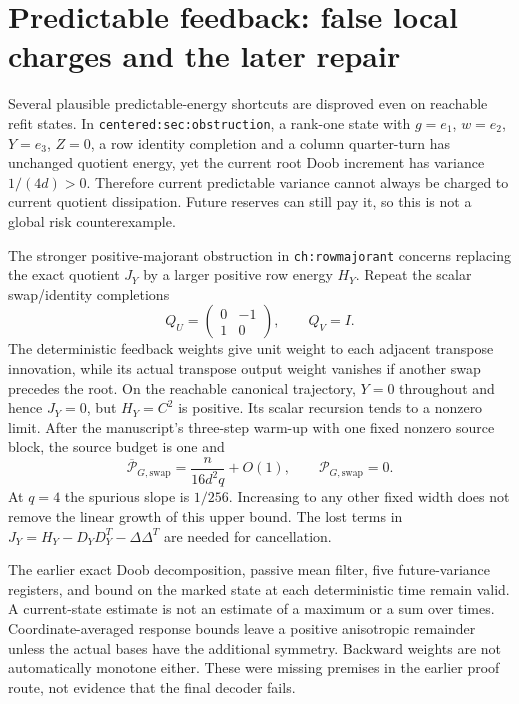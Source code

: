 \documentclass[11pt,oneside,openany,a4paper]{report}
\numberwithin{equation}{chapter}
\theoremstyle{definition}
\theoremstyle{remark}
\begin{document}
\section{Predictable feedback: false local charges and the later repair}
\label{origobs:predictable}

Several plausible predictable-energy shortcuts are disproved even
on reachable refit states.  In \texttt{centered:sec:obstruction},
a rank-one state with $g=e_1$, $w=e_2$, $Y=e_3$, $Z=0$, a row
identity completion and a column quarter-turn has unchanged quotient
energy, yet the current root Doob increment has variance
$1/(4d)>0$.  Therefore current predictable variance cannot always be
charged to current quotient dissipation.  Future reserves can still
pay it, so this is not a global risk counterexample.

The stronger positive-majorant obstruction in
\texttt{ch:rowmajorant} concerns replacing the exact quotient
$J_Y$ by a larger positive row energy $H_Y$.  Repeat the scalar
swap/identity completions
\[
 Q_U=\begin{pmatrix}0&-1\\1&0\end{pmatrix},\qquad Q_V=I.
\]
The deterministic feedback weights give unit weight to each adjacent
transpose innovation, while its actual transpose output weight
vanishes if another swap precedes the root.  On the reachable
canonical trajectory, $Y=0$ throughout and hence $J_Y=0$, but
$H_Y=C^2$ is positive.  Its scalar recursion tends to a nonzero
limit.  After the manuscript's three-step warm-up with one fixed
nonzero source block, the source budget is one and
\[
 \overline{\mathcal P}_{G,\mathrm{swap}}
   =\frac{n}{16d^2q}+O(1),\qquad
 \mathcal P_{G,\mathrm{swap}}=0.
\]
At $q=4$ the spurious slope is $1/256$.  Increasing to any other
fixed width does not remove the linear growth of this upper bound.
The lost terms in
$J_Y=H_Y-D_YD_Y^T-\Delta\Delta^T$ are needed for cancellation.

The earlier exact Doob decomposition, passive mean filter, five
future-variance registers, and bound on the marked state at each
deterministic time remain valid.  A current-state estimate is not an
estimate of a maximum or a sum over times.  Coordinate-averaged
response bounds leave a positive anisotropic remainder unless the
actual bases have the additional symmetry.  Backward weights are not
automatically monotone either.  These were missing premises in the
earlier proof route, not evidence that the final decoder fails.
\end{document}
